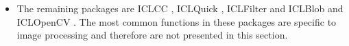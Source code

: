 \begin{itemize}
\item The remaining packages are ICLCC , ICLQuick , ICLFilter  and ICLBlob  and ICLOpenCV . The most common functions in these packages are specific to image processing and therefore are not presented in this section.


\end{itemize}

